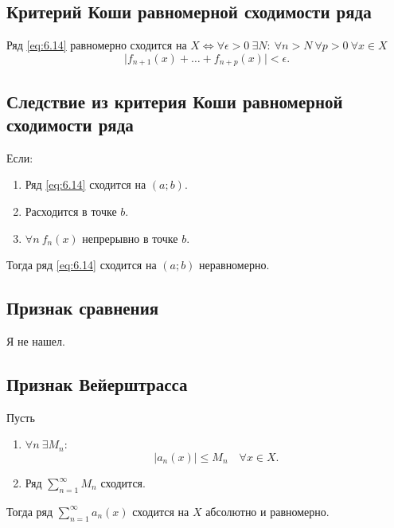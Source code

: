 \subsection{Критерий Коши равномерной сходимости ряда}

\begin{theorem}
    Ряд \ref{eq:6.14} равномерно сходится на $X \iff \forall \epsilon > 0 \ \exists N: \ \forall n > N \ \forall p > 0 \ \forall x \in X$
    \[
        \big|f_{n+1}(x) + \ldots + f_{n+p}(x)\big| < \epsilon.
    \]
\end{theorem}

\subsection{Следствие из критерия Коши равномерной сходимости ряда}

\begin{corollary}
    Если:
    \begin{enumerate}
        \item Ряд \ref{eq:6.14} сходится на $(a;b)$.
        \item Расходится в точке $b$.
        \item $\forall n \ f_n(x)$ непрерывно в точке $b$.
    \end{enumerate}

    Тогда ряд \ref{eq:6.14} сходится на $(a;b)$ неравномерно.
\end{corollary}

\subsection{Признак сравнения}

Я не нашел.

\subsection{Признак Вейерштрасса}

\begin{corollary}
    Пусть
    \begin{enumerate}
        \item $\forall n \ \exists M_n$:
              \[
                  \big|a_n(x)\big| \leqslant M_n \quad \forall x \in X.
              \]
        \item Ряд $\sum_{n=1}^{\infty} M_n$ сходится.
    \end{enumerate}

    Тогда ряд $\sum_{n=1}^{\infty}a_n(x)$ сходится на $X$ абсолютно и равномерно.
\end{corollary}

